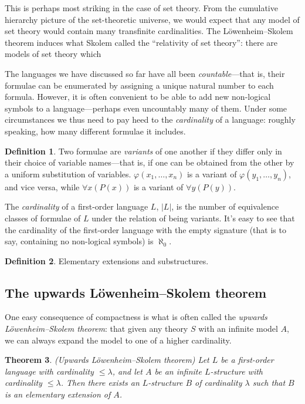 \documentclass[10pt, a4paper, oneside]{article}
\newtheorem{thm}{Theorem}[section]
\theoremstyle{definition}
\newtheorem{dfn}[thm]{Definition}
\theoremstyle{remark}
\theoremstyle{plain}
\begin{document}
This is perhaps most striking in the case of set theory. From the cumulative
hierarchy picture of the set-theoretic universe, we would expect that any model
of set theory would contain many transfinite cardinalities. The
Löwenheim--Skolem theorem induces what Skolem called the ``relativity of set
theory'': there are models of set theory which

The languages we have discussed so far have all been \emph{countable}---that is,
their formulae can be enumerated by assigning a unique natural number to each
formula. However, it is often convenient to be able to add new non-logical
symbols to a language---perhaps even uncountably many of them. Under some
circumstances we thus need to pay heed to the \emph{cardinality} of a language:
roughly speaking, how many different formulae it includes.

\begin{dfn}
    Two formulae are \emph{variants} of one another if they differ only in their
    choice of variable names---that is, if one can be obtained from the other by
    a uniform substitution of variables. $\varphi(x_1, \dotsc, x_n)$ is a
    variant of $\varphi(y_1, \dotsc, y_n)$, and vice versa, while
    $\forall{x} (P(x))$ is a variant of $\forall{y} (P(y))$.
    
    The \emph{cardinality} of a first-order language $L$, $|L|$, is the number
    of equivalence classes of formulae of $L$ under the relation of being
    variants. It's easy to see that the cardinality of the first-order language
    with the empty signature (that is to say, containing no non-logical symbols)
    is $\aleph_0$.
\end{dfn}

\begin{dfn}
    Elementary extensions and substructures.
\end{dfn}

\subsection{The upwards Löwenheim--Skolem theorem}

One easy consequence of compactness is what is often called the \emph{upwards
Löwenheim--Skolem theorem}: that given any theory $S$ with an infinite model
$A$, we can always expand the model to one of a higher cardinality.

\begin{thm}
    (Upwards Löwenheim--Skolem theorem) Let $L$ be a first-order language with
    cardinality $\leq \lambda$, and let $A$ be an infinite $L$-structure with
    cardinality $\leq \lambda$. Then there exists an $L$-structure $B$ of
    cardinality $\lambda$ such that $B$ is an elementary extension of $A$.
\end{thm}
\end{document}
